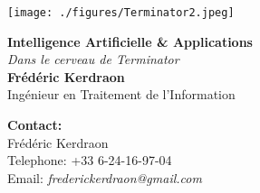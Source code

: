 \documentclass[a0,landscape]{a0poster}
\begin{document}


\begin{minipage}[b]{0.19\linewidth}
\texttt{[image: ./figures/Terminator2.jpeg]} %
\end{minipage}
\begin{minipage}[b]{0.55\linewidth}
\veryHuge \color{DarkSlateGrey} \textbf{Intelligence Artificielle \& Applications}\color{Black}\\ %
\huge\textit{Dans le cerveau de Terminator}\\[0.5cm] %
\huge \textbf{Frédéric Kerdraon}\\ %
\huge Ingénieur en Traitement de l'Information\\ %
\end{minipage}
%
\begin{minipage}[b]{0.25\linewidth}
\color{DarkSlateGray}\Large \textbf{Contact:}\\
Frédéric Kerdraon\\
Telephone: +33 6-24-16-97-04\\ %
Email: \textit{frederickerdraon@gmail.com}\\ %
\end{minipage}
%

\vspace{1cm} %
\end{document}
